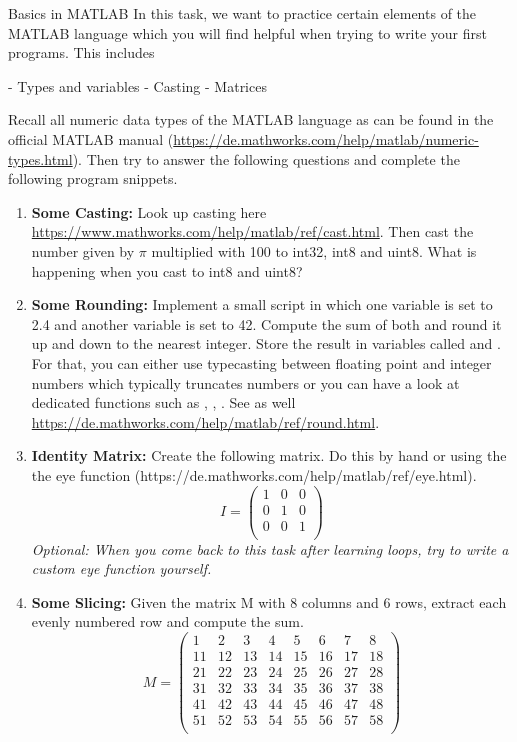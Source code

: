 
\begin{task}{Basics in MATLAB}{}{}
In this task, we want to practice  certain elements of the MATLAB language which you will find helpful when trying to write your first programs. This includes

- Types and variables
- Casting
- Matrices

Recall all numeric data types of the MATLAB language as can be found in the official MATLAB manual (\url{https://de.mathworks.com/help/matlab/numeric-types.html}). Then try to answer the following questions and complete the following program snippets.

\begin{enumerate}

\item{\textbf{Some Casting:} Look up casting here \url{https://www.mathworks.com/help/matlab/ref/cast.html}. Then cast the number given by $\pi$ multiplied with 100 to int32, int8 and uint8. What is happening when you cast to int8 and uint8?
}

\item{\textbf{Some Rounding:} Implement a small script in which one variable is set to 2.4 and another variable is set to 42. Compute the sum of both and round it up and down to the nearest integer. Store the result in variables called  and . For that, you can either use typecasting between floating point and integer numbers which typically truncates numbers or you can have a look at dedicated functions such as , , . See as well \url{https://de.mathworks.com/help/matlab/ref/round.html}.}


\item{\textbf{Identity Matrix:} Create the following matrix. Do this by hand or using the the eye function (https://de.mathworks.com/help/matlab/ref/eye.html).
  \[
  I= \begin{pmatrix}
    1 & 0 & 0\\
    0 & 1 & 0\\
    0 & 0 & 1\\
\end{pmatrix}
  \] \emph{Optional: When you come back to this task after learning loops, try to write a custom eye function yourself.}
  }

\item{\textbf{Some Slicing:} Given the matrix M with 8 columns and 6 rows, extract each evenly numbered row and compute the sum.
  \[
  M= \begin{pmatrix}
1 & 2 & 3 & 4 & 5 & 6 & 7 & 8\\
11 & 12 & 13 & 14 & 15 & 16 & 17 & 18\\
21 & 22 & 23 & 24 & 25 & 26 & 27 & 28\\
31 & 32 & 33 & 34 & 35 & 36 & 37 & 38\\
41 & 42 & 43 & 44 & 45 & 46 & 47 & 48\\
51 & 52 & 53 & 54 & 55 & 56 & 57 & 58\\
\end{pmatrix}
 \]
}


\end{enumerate}
\end{task}
